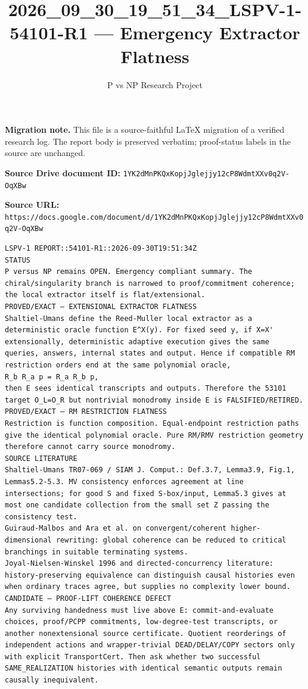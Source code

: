 \documentclass[11pt]{article}
\title{2026\_09\_30\_19\_51\_34\_LSPV-1-54101-R1 — Emergency Extractor Flatness}
\author{P vs NP Research Project}
\date{}
\begin{document}
\maketitle

\noindent\textbf{Migration note.} This file is a source-faithful LaTeX migration of a verified research log. The report body is preserved verbatim; proof-status labels in the source are unchanged.

\noindent\textbf{Source Drive document ID:} \texttt{1YK2dMnPKQxKopjJglejjy12cP8WdmtXXv0q2V-OqXBw}

\noindent\textbf{Source URL:} \texttt{https://docs.google.com/document/d/1YK2dMnPKQxKopjJglejjy12cP8WdmtXXv0q2V-OqXBw}

\bigskip
\begin{Verbatim}[breaklines=true,breakanywhere=true]
LSPV-1 REPORT::54101-R1::2026-09-30T19:51:34Z
STATUS
P versus NP remains OPEN. Emergency compliant summary. The chiral/singularity branch is narrowed to proof/commitment coherence; the local extractor itself is flat/extensional.
PROVED/EXACT — EXTENSIONAL EXTRACTOR FLATNESS
Shaltiel-Umans define the Reed-Muller local extractor as a deterministic oracle function E^X(y). For fixed seed y, if X=X' extensionally, deterministic adaptive execution gives the same queries, answers, internal states and output. Hence if compatible RM restriction orders end at the same polynomial oracle,
R_b R_a p = R_a R_b p,
then E sees identical transcripts and outputs. Therefore the 53101 target O_L=O_R but nontrivial monodromy inside E is FALSIFIED/RETIRED.
PROVED/EXACT — RM RESTRICTION FLATNESS
Restriction is function composition. Equal-endpoint restriction paths give the identical polynomial oracle. Pure RM/RMV restriction geometry therefore cannot carry source monodromy.
SOURCE LITERATURE
Shaltiel-Umans TR07-069 / SIAM J. Comput.: Def.3.7, Lemma3.9, Fig.1, Lemmas5.2-5.3. MV consistency enforces agreement at line intersections; for good S and fixed S-box/input, Lemma5.3 gives at most one candidate collection from the small set Z passing the consistency test.
Guiraud-Malbos and Ara et al. on convergent/coherent higher-dimensional rewriting: global coherence can be reduced to critical branchings in suitable terminating systems.
Joyal-Nielsen-Winskel 1996 and directed-concurrency literature: history-preserving equivalence can distinguish causal histories even when ordinary traces agree, but supplies no complexity lower bound.
CANDIDATE — PROOF-LIFT COHERENCE DEFECT
Any surviving handedness must live above E: commit-and-evaluate choices, proof/PCPP commitments, low-degree-test transcripts, or another nonextensional source certificate. Quotient reorderings of independent actions and wrapper-trivial DEAD/DELAY/COPY sectors only with explicit TransportCert. Then ask whether two successful SAME_REALIZATION histories with identical semantic outputs remain causally inequivalent.

\end{Verbatim}
\end{document}
